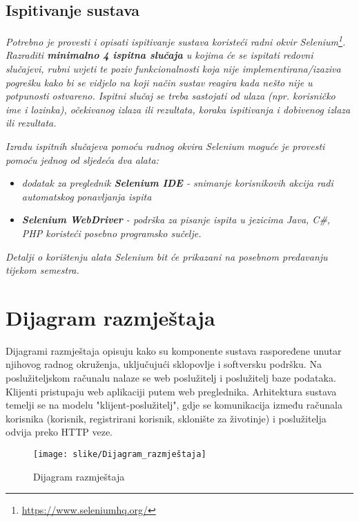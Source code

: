 			
			
			\subsection{Ispitivanje sustava}
			
			 \textit{Potrebno je provesti i opisati ispitivanje sustava koristeći radni okvir Selenium\footnote{\url{https://www.seleniumhq.org/}}. Razraditi \textbf{minimalno 4 ispitna slučaja} u kojima će se ispitati redovni slučajevi, rubni uvjeti te poziv funkcionalnosti koja nije implementirana/izaziva pogrešku kako bi se vidjelo na koji način sustav reagira kada nešto nije u potpunosti ostvareno. Ispitni slučaj se treba sastojati od ulaza (npr. korisničko ime i lozinka), očekivanog izlaza ili rezultata, koraka ispitivanja i dobivenog izlaza ili rezultata.\\ }
			 
			 \textit{Izradu ispitnih slučajeva pomoću radnog okvira Selenium moguće je provesti pomoću jednog od sljedeća dva alata:}
			 \begin{itemize}
			 	\item \textit{dodatak za preglednik \textbf{Selenium IDE} - snimanje korisnikovih akcija radi automatskog ponavljanja ispita	}
			 	\item \textit{\textbf{Selenium WebDriver} - podrška za pisanje ispita u jezicima Java, C\#, PHP koristeći posebno programsko sučelje.}
			 \end{itemize}
		 	\textit{Detalji o korištenju alata Selenium bit će prikazani na posebnom predavanju tijekom semestra.}
			
			\eject 
		
		
		\section{Dijagram razmještaja}
			
                \noindent Dijagrami razmještaja opisuju kako su komponente sustava raspoređene unutar njihovog radnog okruženja, uključujući sklopovlje i softversku podršku. Na poslužiteljskom računalu nalaze se web poslužitelj i poslužitelj baze podataka. Klijenti pristupaju web aplikaciji putem web preglednika. Arhitektura sustava temelji se na modelu "klijent-poslužitelj", gdje se komunikacija između računala korisnika (korisnik, registrirani korisnik, sklonište za životinje) i poslužitelja odvija preko HTTP veze.

                \begin{figure}[!htb]
		      \centering
		    \texttt{[image: slike/Dijagram\_razmještaja]}
		      \caption{Dijagram razmještaja}
		      \end{figure}
        
